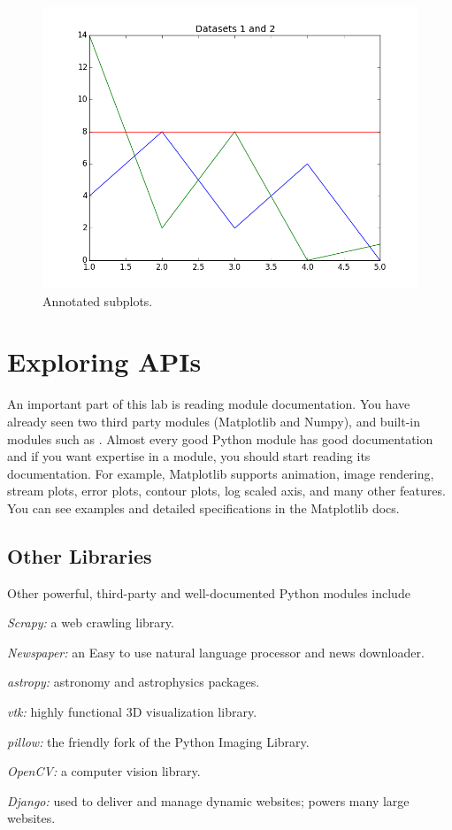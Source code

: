 \documentclass[11pt]{cselabheader}
\begin{document}
\begin{figure}[H]
  \centering
  \includegraphics[width=\textwidth]{img/matplotlib_overlayed.png}
  \caption{Annotated subplots.}
\end{figure}

\section{Exploring APIs}
An important part of this lab is reading module documentation. You
have already seen two third party modules (Matplotlib and Numpy), and
built-in modules such as . Almost every good Python
module has good documentation and if you want expertise in a module,
you should start reading its documentation.  For example, Matplotlib
supports animation, image rendering, stream plots, error plots,
contour plots, log scaled axis, and many other features. You can see
examples and detailed specifications in the Matplotlib docs.

\subsection{Other Libraries}
Other powerful, third-party and well-documented Python modules include
\begin{inparaenum}
\item \textsl{Scrapy:} a web crawling library.
\item \textsl{Newspaper:} an Easy to use natural language processor and news downloader.
\item \textsl{astropy:} astronomy and astrophysics packages.
\item \textsl{vtk:} highly functional 3D visualization library.
\item \textsl{pillow:} the friendly fork of the Python Imaging Library.
\item \textsl{OpenCV:} a computer vision library.
\item \textsl{Django:} used to deliver and manage dynamic websites; powers many large websites.
\end{inparaenum}
\end{document}
